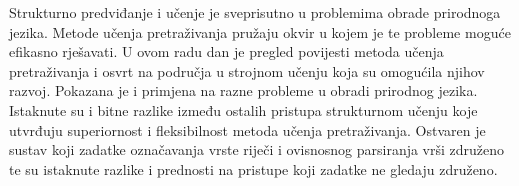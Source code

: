 \begin{sazetak}
Strukturno predviđanje i učenje je sveprisutno u problemima obrade prirodnoga
jezika. Metode učenja pretraživanja pružaju okvir u kojem je te probleme moguće
efikasno rješavati. U ovom radu dan je pregled povijesti metoda učenja
pretraživanja i osvrt na područja u strojnom učenju koja su omogućila njihov
razvoj. Pokazana je i primjena na razne probleme u obradi prirodnog jezika.
Istaknute su i bitne razlike između ostalih pristupa strukturnom učenju koje
utvrđuju superiornost i fleksibilnost metoda učenja pretraživanja. Ostvaren je
sustav koji zadatke označavanja vrste riječi i ovisnosnog parsiranja vrši
združeno te su istaknute razlike i prednosti na pristupe koji zadatke ne gledaju
združeno.

\end{sazetak}

